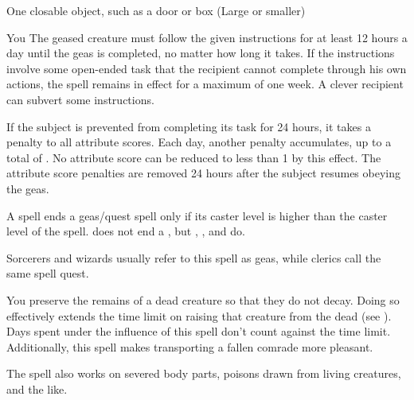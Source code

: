 \begin{spelltarget}{One closable object, such as a door or box (Large or smaller)}
\begin{spelltarget}{You}
The geased creature must follow the given instructions for at least 12 hours a day until the geas is completed, no matter how long it takes. If the instructions involve some open-ended task that the recipient cannot complete through his own actions, the spell remains in effect for a maximum of one week. A clever recipient can subvert some instructions.
\par If the subject is prevented from completing its task for 24 hours, it takes a  penalty to all attribute scores. Each day, another  penalty accumulates, up to a total of . No attribute score can be reduced to less than 1 by this effect. The attribute score penalties are removed 24 hours after the subject resumes obeying the geas.
\spellnotes \par A  spell ends a geas/quest spell only if its caster level is higher than the caster level of the  spell.  does not end a , but , , and  do.
\par Sorcerers and wizards usually refer to this spell as geas, while clerics call the same spell quest.

\spelleffect You preserve the remains of a dead creature so that they do not decay. Doing so effectively extends the time limit on raising that creature from the dead (see ). Days spent under the influence of this spell don't count against the time limit. Additionally, this spell makes transporting a fallen comrade more pleasant.
\par The spell also works on severed body parts, poisons drawn from living creatures, and the like.


\end{spelltarget}
\end{spelltarget}
